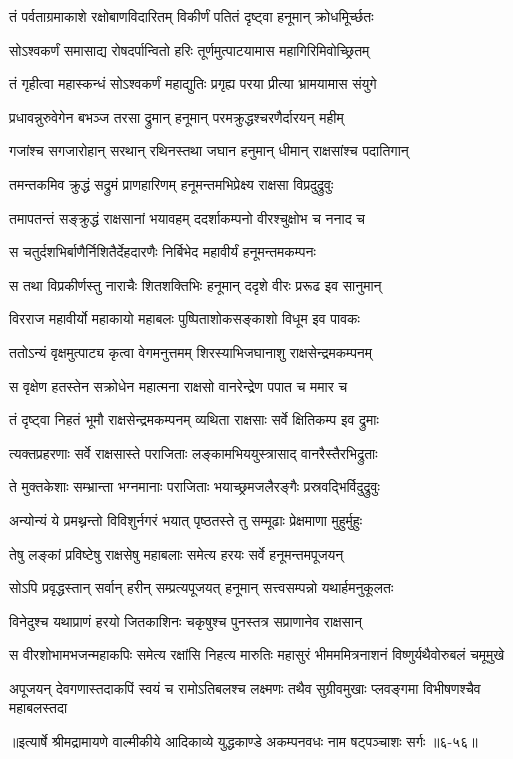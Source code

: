 \twolineshloka
{तं पर्वताग्रमाकाशे रक्षोबाणविदारितम्}
{विकीर्णं पतितं दृष्ट्वा हनूमान् क्रोधमूिर्च्छतः} %

\twolineshloka
{सोऽश्वकर्णं समासाद्य रोषदर्पान्वितो हरिः}
{तूर्णमुत्पाटयामास महागिरिमिवोच्छ्रितम्} %

\twolineshloka
{तं गृहीत्वा महास्कन्धं सोऽश्वकर्णं महाद्युतिः}
{प्रगृह्य परया प्रीत्या भ्रामयामास संयुगे} %

\twolineshloka
{प्रधावन्नुरुवेगेन बभञ्ज तरसा द्रुमान्}
{हनूमान् परमक्रुद्धश्चरणैर्दारयन् महीम्} %

\twolineshloka
{गजांश्च सगजारोहान् सरथान् रथिनस्तथा}
{जघान हनुमान् धीमान् राक्षसांश्च पदातिगान्} %

\twolineshloka
{तमन्तकमिव क्रुद्धं सद्रुमं प्राणहारिणम्}
{हनूमन्तमभिप्रेक्ष्य राक्षसा विप्रदुद्रुवुः} %

\twolineshloka
{तमापतन्तं सङ्क्रुद्धं राक्षसानां भयावहम्}
{ददर्शाकम्पनो वीरश्चुक्षोभ च ननाद च} %

\twolineshloka
{स चतुर्दशभिर्बाणैर्निशितैर्देहदारणैः}
{निर्बिभेद महावीर्यं हनूमन्तमकम्पनः} %

\twolineshloka
{स तथा विप्रकीर्णस्तु नाराचैः शितशक्तिभिः}
{हनूमान् ददृशे वीरः प्ररूढ इव सानुमान्} %

\twolineshloka
{विरराज महावीर्यो महाकायो महाबलः}
{पुष्पिताशोकसङ्काशो विधूम इव पावकः} %

\twolineshloka
{ततोऽन्यं वृक्षमुत्पाट्य कृत्वा वेगमनुत्तमम्}
{शिरस्याभिजघानाशु राक्षसेन्द्रमकम्पनम्} %

\twolineshloka
{स वृक्षेण हतस्तेन सक्रोधेन महात्मना}
{राक्षसो वानरेन्द्रेण पपात च ममार च} %

\twolineshloka
{तं दृष्ट्वा निहतं भूमौ राक्षसेन्द्रमकम्पनम्}
{व्यथिता राक्षसाः सर्वे क्षितिकम्प इव द्रुमाः} %

\twolineshloka
{त्यक्तप्रहरणाः सर्वे राक्षसास्ते पराजिताः}
{लङ्कामभिययुस्त्रासाद् वानरैस्तैरभिद्रुताः} %

\twolineshloka
{ते मुक्तकेशाः सम्भ्रान्ता भग्नमानाः पराजिताः}
{भयाच्छ्रमजलैरङ्गैः प्रस्रवद्भिर्विदुद्रुवुः} %

\twolineshloka
{अन्योन्यं ये प्रमथ्नन्तो विविशुर्नगरं भयात्}
{पृष्ठतस्ते तु सम्मूढाः प्रेक्षमाणा मुहुर्मुहुः} %

\twolineshloka
{तेषु लङ्कां प्रविष्टेषु राक्षसेषु महाबलाः}
{समेत्य हरयः सर्वे हनूमन्तमपूजयन्} %

\twolineshloka
{सोऽपि प्रवृद्धस्तान् सर्वान् हरीन् सम्प्रत्यपूजयत्}
{हनूमान् सत्त्वसम्पन्नो यथार्हमनुकूलतः} %

\twolineshloka
{विनेदुश्च यथाप्राणं हरयो जितकाशिनः}
{चकृषुश्च पुनस्तत्र सप्राणानेव राक्षसान्} %

\twolineshloka
{स वीरशोभामभजन्महाकपिः समेत्य रक्षांसि निहत्य मारुतिः}
{महासुरं भीमममित्रनाशनं विष्णुर्यथैवोरुबलं चमूमुखे} %

\twolineshloka
{अपूजयन् देवगणास्तदाकपिं स्वयं च रामोऽतिबलश्च लक्ष्मणः}
{तथैव सुग्रीवमुखाः प्लवङ्गमा विभीषणश्चैव महाबलस्तदा} %


॥इत्यार्षे श्रीमद्रामायणे वाल्मीकीये आदिकाव्ये युद्धकाण्डे अकम्पनवधः नाम षट्पञ्चाशः सर्गः ॥६-५६॥
